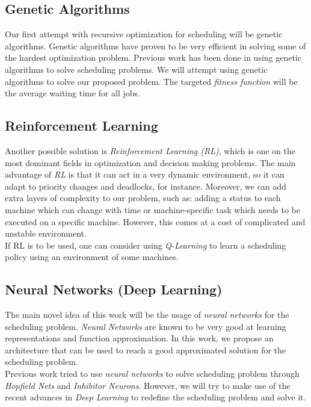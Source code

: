 \documentclass[twocolumn,11pt]{IEEEtran}
\begin{document}
    \subsection{Genetic Algorithms}
    Our first attempt with recursive optimization for scheduling will be genetic algorithms. Genetic algorithms have proven to be very efficient in solving some of the hardest optimization problem. Previous work has been done in using genetic algorithms to solve scheduling problems. We will attempt using genetic algorithms to solve our proposed problem. The targeted \emph{fitness function} will be the average waiting time for all jobs. 

    \subsection{Reinforcement Learning}
    Another possible solution is \emph{Reinforcement Learning (RL)}, which is one on the most dominant fields in optimization and decision making problems. The main advantage of \emph{RL} is that it can act in a very dynamic environment, so it can adapt to priority changes and deadlocks, for instance. Moreover, we can add extra layers of complexity to our problem, such as: adding a status to each machine which can change with time or machine-specific task which needs to be executed on a specific machine. However, this comes at a cost of complicated and unstable environment. \\
    If RL is to be used, one can consider using \emph{Q-Learning} to learn a scheduling policy using an environment of some machines. 

    \subsection{Neural Networks (Deep Learning)}
    The main novel idea of this work will be the usage of \emph{neural networks} for the scheduling problem. \emph{Neural Networks} are known to be very good at learning representations and function approximation. In this work, we propose an architecture that can be used to reach a good approximated solution for the scheduling problem.\\
    Previous work tried to use \emph{neural networks} to solve scheduling problem through \emph{Hopfield Nets} and \emph{Inhibitor Neurons}. However, we will try to make use of the recent advances in \emph{Deep Learning} to redefine the scheduling problem and solve it.
    
\end{document}
